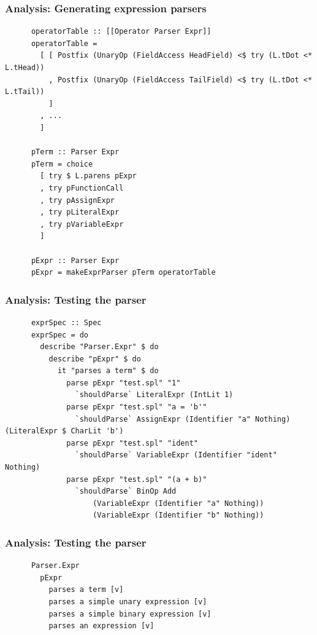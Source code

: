 \documentclass{beamer}
\begin{document}
\begin{frame}[fragile]
  \frametitle{Analysis: Generating expression parsers}

  \begin{center}
    \begin{verbatim}
      operatorTable :: [[Operator Parser Expr]]
      operatorTable =
        [ [ Postfix (UnaryOp (FieldAccess HeadField) <$ try (L.tDot <* L.tHead))
          , Postfix (UnaryOp (FieldAccess TailField) <$ try (L.tDot <* L.tTail))
          ]
        , ...
        ]

      pTerm :: Parser Expr
      pTerm = choice
        [ try $ L.parens pExpr
        , try pFunctionCall
        , try pAssignExpr
        , try pLiteralExpr
        , try pVariableExpr
        ]

      pExpr :: Parser Expr
      pExpr = makeExprParser pTerm operatorTable
    \end{verbatim}
  \end{center}
\end{frame}

\begin{frame}[fragile]
  \frametitle{Analysis: Testing the parser}

  \begin{center}
    \begin{verbatim}
      exprSpec :: Spec
      exprSpec = do
        describe "Parser.Expr" $ do
          describe "pExpr" $ do
            it "parses a term" $ do
              parse pExpr "test.spl" "1" 
                `shouldParse` LiteralExpr (IntLit 1)
              parse pExpr "test.spl" "a = 'b'" 
                `shouldParse` AssignExpr (Identifier "a" Nothing) (LiteralExpr $ CharLit 'b')
              parse pExpr "test.spl" "ident"
                `shouldParse` VariableExpr (Identifier "ident" Nothing)
              parse pExpr "test.spl" "(a + b)"
                `shouldParse` BinOp Add 
                    (VariableExpr (Identifier "a" Nothing))
                    (VariableExpr (Identifier "b" Nothing))
    \end{verbatim}
  \end{center}

  
\end{frame}

\begin{frame}[fragile]
  \frametitle{Analysis: Testing the parser}

  \begin{center}
    \begin{verbatim}
      Parser.Expr
        pExpr
          parses a term [v]
          parses a simple unary expression [v]
          parses a simple binary expression [v]
          parses an expression [v]
    \end{verbatim}
  \end{center}
\end{frame}
\end{document}
